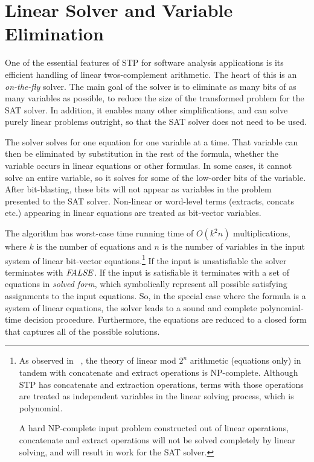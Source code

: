 \section{Linear Solver and Variable Elimination}

One of the essential features of STP for software analysis
applications is its efficient handling of linear twos-complement
arithmetic.  The heart of this is an {\em on-the-fly\/} solver.  The
main goal of the solver is to eliminate as many bits of as many
variables as possible, to reduce the size of the transformed problem
for the SAT solver.  In addition, it enables many other
simplifications, and can solve purely linear problems outright, so
that the SAT solver does not need to be used.

The solver solves for one equation for one variable at a time.  That
variable can then be eliminated by substitution in the rest of the
formula, whether the variable occurs in linear equations or other
formulas.  In some cases, it cannot solve an entire variable, so it
solves for some of the low-order bits of the variable.  After
bit-blasting, these bits will not appear as variables in the problem
presented to the SAT solver. Non-linear or word-level terms (extracts,
concats etc.) appearing in linear equations are treated as bit-vector
variables.

The algorithm has worst-case time running time of $O(k^2n)$
multiplications, where $k$ is the number of equations and $n$ is the
number of variables in the input system of linear bit-vector
equations.\footnote{As observed in ~\cite{BDL98}, the theory of linear
mod $2^n$ arithmetic (equations only) in tandem with concatenate and
extract operations is NP-complete. Although STP has concatenate and
extraction operations, terms with those operations are treated as
independent variables in the linear solving process, which is
polynomial. 

A hard NP-complete input problem constructed out of linear operations,
concatenate and extract operations will not be solved completely by
linear solving, and will result in work for the SAT solver.}  If the
input is unsatisfiable the solver terminates with ${\it FALSE}$. If the
input is satisfiable it terminates with a set of equations in
\textit{solved form}, which symbolically represent all possible
satisfying assignments to the input equations.  So, in the special
case where the formula is a system of linear equations, the solver
leads to a sound and complete polynomial-time decision procedure.
Furthermore, the equations are reduced to a closed form that captures
all of the possible solutions.


